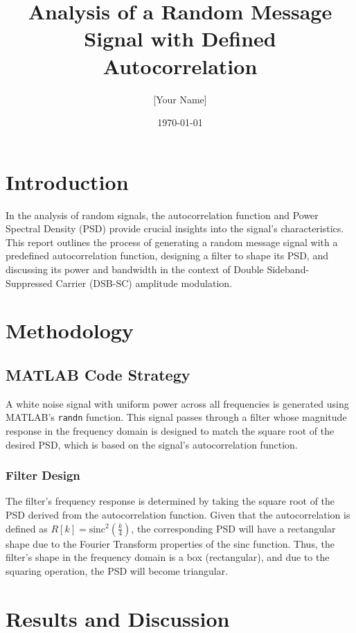 \documentclass[11pt]{article}
\begin{document}
\title{Analysis of a Random Message Signal with Defined Autocorrelation}
\author{[Your Name]}
\date{\today}
\maketitle

\section{Introduction}
In the analysis of random signals, the autocorrelation function and Power Spectral Density (PSD) provide crucial insights into the signal's characteristics. This report outlines the process of generating a random message signal with a predefined autocorrelation function, designing a filter to shape its PSD, and discussing its power and bandwidth in the context of Double Sideband-Suppressed Carrier (DSB-SC) amplitude modulation.

\section{Methodology}

\subsection{MATLAB Code Strategy}
A white noise signal with uniform power across all frequencies is generated using MATLAB's \texttt{randn} function. This signal passes through a filter whose magnitude response in the frequency domain is designed to match the square root of the desired PSD, which is based on the signal's autocorrelation function.

\subsubsection{Filter Design}
The filter's frequency response is determined by taking the square root of the PSD derived from the autocorrelation function. Given that the autocorrelation is defined as \( R[k] = \text{sinc}^2\left(\frac{k}{4}\right) \), the corresponding PSD will have a rectangular shape due to the Fourier Transform properties of the sinc function. Thus, the filter's shape in the frequency domain is a box (rectangular), and due to the squaring operation, the PSD will become triangular.

\section{Results and Discussion}
\end{document}
